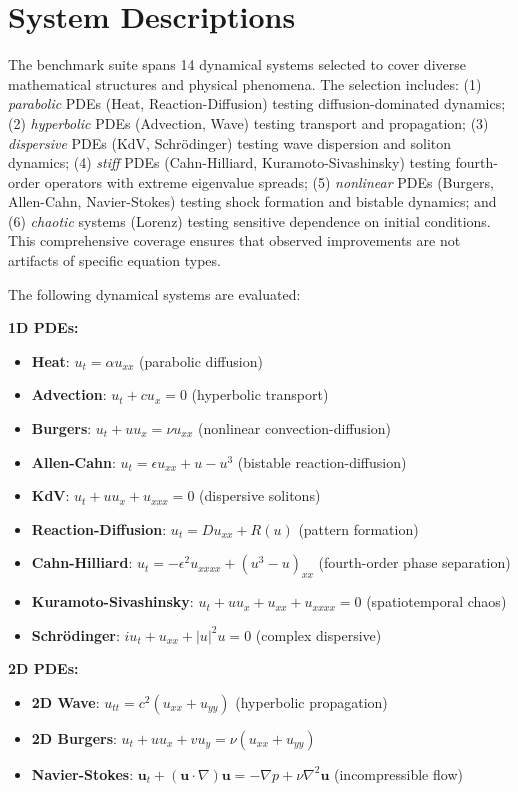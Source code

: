 \documentclass{article}
\theoremstyle{remark}
\begin{document}


\appendix
\section{System Descriptions}
\label{app:systems}

The benchmark suite spans 14 dynamical systems selected to cover diverse mathematical structures and physical phenomena. The selection includes: (1) \textit{parabolic} PDEs (Heat, Reaction-Diffusion) testing diffusion-dominated dynamics; (2) \textit{hyperbolic} PDEs (Advection, Wave) testing transport and propagation; (3) \textit{dispersive} PDEs (KdV, Schr\"odinger) testing wave dispersion and soliton dynamics; (4) \textit{stiff} PDEs (Cahn-Hilliard, Kuramoto-Sivashinsky) testing fourth-order operators with extreme eigenvalue spreads; (5) \textit{nonlinear} PDEs (Burgers, Allen-Cahn, Navier-Stokes) testing shock formation and bistable dynamics; and (6) \textit{chaotic} systems (Lorenz) testing sensitive dependence on initial conditions. This comprehensive coverage ensures that observed improvements are not artifacts of specific equation types.

The following dynamical systems are evaluated:

\textbf{1D PDEs:}
\begin{itemize}
\item \textbf{Heat}: $u_t = \alpha u_{xx}$ (parabolic diffusion)
\item \textbf{Advection}: $u_t + c u_x = 0$ (hyperbolic transport)
\item \textbf{Burgers}: $u_t + u u_x = \nu u_{xx}$ (nonlinear convection-diffusion)
\item \textbf{Allen-Cahn}: $u_t = \epsilon u_{xx} + u - u^3$ (bistable reaction-diffusion)
\item \textbf{KdV}: $u_t + u u_x + u_{xxx} = 0$ (dispersive solitons)
\item \textbf{Reaction-Diffusion}: $u_t = D u_{xx} + R(u)$ (pattern formation)
\item \textbf{Cahn-Hilliard}: $u_t = -\epsilon^2 u_{xxxx} + (u^3 - u)_{xx}$ (fourth-order phase separation)
\item \textbf{Kuramoto-Sivashinsky}: $u_t + u u_x + u_{xx} + u_{xxxx} = 0$ (spatiotemporal chaos)
\item \textbf{Schr\"odinger}: $i u_t + u_{xx} + |u|^2 u = 0$ (complex dispersive)
\end{itemize}

\textbf{2D PDEs:}
\begin{itemize}
\item \textbf{2D Wave}: $u_{tt} = c^2 (u_{xx} + u_{yy})$ (hyperbolic propagation)
\item \textbf{2D Burgers}: $u_t + u u_x + v u_y = \nu (u_{xx} + u_{yy})$
\item \textbf{Navier-Stokes}: $\mathbf{u}_t + (\mathbf{u} \cdot \nabla)\mathbf{u} = -\nabla p + \nu \nabla^2 \mathbf{u}$ (incompressible flow)
\end{itemize}
\end{document}

